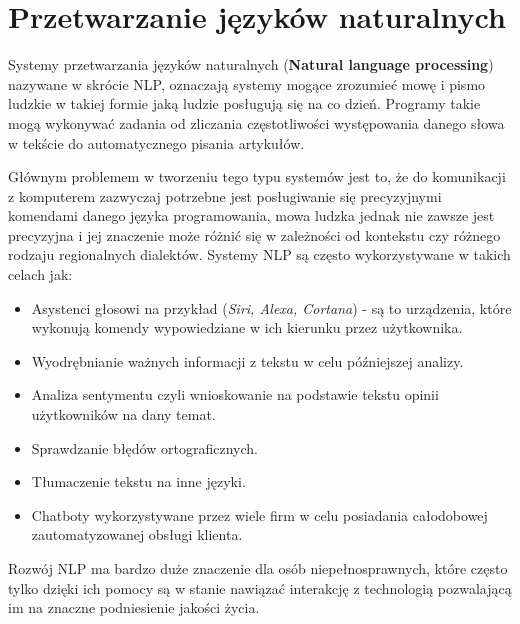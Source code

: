 
\chapter{Przetwarzanie języków naturalnych}
Systemy przetwarzania języków naturalnych (\textbf{Natural language processing}) nazywane 
w skrócie NLP, oznaczają systemy mogące zrozumieć mowę i pismo ludzkie w takiej
formie jaką ludzie posługują się na co dzień. Programy takie mogą wykonywać zadania od zliczania
częstotliwości występowania danego słowa w tekście do automatycznego pisania artykułów. 

Głównym problemem w tworzeniu tego typu systemów jest to, że do komunikacji z komputerem zazwyczaj
potrzebne jest posługiwanie się precyzyjnymi komendami danego języka programowania, mowa ludzka
jednak nie zawsze jest precyzyjna i jej znaczenie może różnić się w zależności od kontekstu czy
różnego rodzaju regionalnych dialektów. Systemy NLP są często wykorzystywane w takich 
celach jak:
\begin{itemize}
    \item Asystenci głosowi na przykład (\textit{Siri, Alexa, Cortana}) - są to urządzenia, które 
    wykonują komendy wypowiedziane w ich kierunku przez użytkownika.  
    \item Wyodrębnianie ważnych informacji z tekstu w celu późniejszej analizy.
    \item Analiza sentymentu czyli wnioskowanie na podstawie tekstu opinii użytkowników na dany temat.
    \item Sprawdzanie błędów ortograficznych.
    \item Tłumaczenie tekstu na inne języki.
    \item Chatboty wykorzystywane przez wiele firm w celu posiadania całodobowej zautomatyzowanej obsługi klienta.
\end{itemize}
Rozwój NLP ma bardzo duże znaczenie dla osób niepełnosprawnych, które często tylko dzięki ich pomocy są 
w stanie nawiązać interakcję z technologią pozwalającą im na znaczne podniesienie jakości życia.
